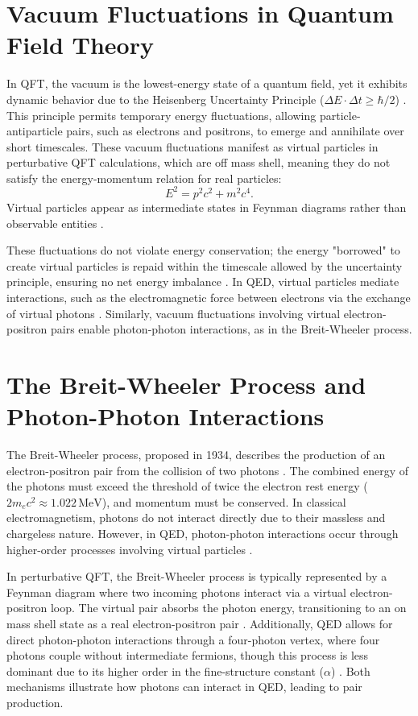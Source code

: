 \documentclass[aps,prl,twocolumn,superscriptaddress]{revtex4-2}
\begin{document}
	\section{Vacuum Fluctuations in Quantum Field Theory}
	In QFT, the vacuum is the lowest-energy state of a quantum field, yet it exhibits dynamic behavior due to the Heisenberg Uncertainty Principle (\(\Delta E \cdot \Delta t \geq \hbar/2\)) \citep{Heisenberg1927, Dirac1930}. This principle permits temporary energy fluctuations, allowing particle-antiparticle pairs, such as electrons and positrons, to emerge and annihilate over short timescales. These vacuum fluctuations manifest as virtual particles in perturbative QFT calculations, which are off mass shell, meaning they do not satisfy the energy-momentum relation for real particles:
	\begin{equation}
		E^2 = p^2 c^2 + m^2 c^4.
	\end{equation}
	Virtual particles appear as intermediate states in Feynman diagrams rather than observable entities \citep{Feynman1949}.
	
	These fluctuations do not violate energy conservation; the energy "borrowed" to create virtual particles is repaid within the timescale allowed by the uncertainty principle, ensuring no net energy imbalance \citep{Peskin1995}. In QED, virtual particles mediate interactions, such as the electromagnetic force between electrons via the exchange of virtual photons \citep{Feynman1949}. Similarly, vacuum fluctuations involving virtual electron-positron pairs enable photon-photon interactions, as in the Breit-Wheeler process.
	
	\section{The Breit-Wheeler Process and Photon-Photon Interactions}
	The Breit-Wheeler process, proposed in 1934, describes the production of an electron-positron pair from the collision of two photons \citep{Breit1934}. The combined energy of the photons must exceed the threshold of twice the electron rest energy (\(2m_e c^2 \approx 1.022 \, \text{MeV}\)), and momentum must be conserved. In classical electromagnetism, photons do not interact directly due to their massless and chargeless nature. However, in QED, photon-photon interactions occur through higher-order processes involving virtual particles \citep{Berestetskii1982}.
	
	In perturbative QFT, the Breit-Wheeler process is typically represented by a Feynman diagram where two incoming photons interact via a virtual electron-positron loop. The virtual pair absorbs the photon energy, transitioning to an on mass shell state as a real electron-positron pair \citep{Peskin1995}. Additionally, QED allows for direct photon-photon interactions through a four-photon vertex, where four photons couple without intermediate fermions, though this process is less dominant due to its higher order in the fine-structure constant (\(\alpha\)) \citep{Karplus1951}. Both mechanisms illustrate how photons can interact in QED, leading to pair production.
	
\end{document}
